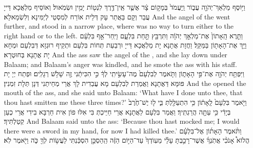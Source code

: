 {וַיּ֥וֹסֶף מַלְאַךְ־יְהֹוָ֖ה עֲב֑וֹר וַֽיַּעֲמֹד֙ בְּמָק֣וֹם צָ֔ר אֲשֶׁ֛ר אֵֽין־דֶּ֥רֶךְ לִנְט֖וֹת יָמִ֥ין וּשְׂמֹֽאול׃
}
{וְאוֹסֵיף מַלְאֲכָא דַּייָ עֲבַר וְקָם בַּאֲתַר עָק דְּלֵית אוֹרַח לְמִסְטֵי לְיַמִּינָא וְלִשְׂמָאלָא׃}
{And the angel of the \lord\space went further, and stood in a narrow place, where was no way to turn either to the right hand or to the left.}{}
{וַתֵּ֤רֶא הָֽאָתוֹן֙ אֶת־מַלְאַ֣ךְ יְהֹוָ֔ה וַתִּרְבַּ֖ץ תַּ֣חַת בִּלְעָ֑ם וַיִּֽחַר־אַ֣ף בִּלְעָ֔ם וַיַּ֥ךְ אֶת־הָאָת֖וֹן בַּמַּקֵּֽל׃}
{וַחֲזָת אֲתָנָא יָת מַלְאֲכָא דַּייָ וּרְבַעַת תְּחוֹת בִּלְעָם וּתְקֵיף רוּגְזָא דְּבִלְעָם וּמְחָא יָת אֲתָנָא בְּחוּטְרָא׃}
{And the ass saw the angel of the \lord, and she lay down under Balaam; and Balaam’s anger was kindled, and he smote the ass with his staff.}{}
{וַיִּפְתַּ֥ח יְהֹוָ֖ה אֶת־פִּ֣י הָאָת֑וֹן וַתֹּ֤אמֶר לְבִלְעָם֙ מֶה־עָשִׂ֣יתִֽי לְךָ֔ כִּ֣י הִכִּיתַ֔נִי זֶ֖ה שָׁלֹ֥שׁ רְגָלִֽים׃
}
{וּפְתַח יְיָ יָת פּוּמָּא דַּאֲתָנָא וַאֲמַרַת לְבִלְעָם מָא עֲבַדִית לָךְ אֲרֵי מְחֵיתַנִי דְּנָן תְּלָת זִמְנִין׃}
{And the \lord\space opened the mouth of the ass, and she said unto Balaam: ‘What have I done unto thee, that thou hast smitten me these three times?’}{}
{וַיֹּ֤אמֶר בִּלְעָם֙ לָֽאָת֔וֹן כִּ֥י הִתְעַלַּ֖לְתְּ בִּ֑י ל֤וּ יֶשׁ־חֶ֙רֶב֙ בְּיָדִ֔י כִּ֥י עַתָּ֖ה הֲרַגְתִּֽיךְ׃
}
{וַאֲמַר בִּלְעָם לַאֲתָנָא אֲרֵי חַיֵּיכְתְּ בִּי אִלּוּ פוֹן אִית חַרְבָּא בִידִי אֲרֵי כְעַן קְטַלְתִּיךְ׃}
{And Balaam said unto the ass: ‘Because thou hast mocked me; I would there were a sword in my hand, for now I had killed thee.’}{}
{וַתֹּ֨אמֶר הָאָת֜וֹן אֶל־בִּלְעָ֗ם הֲלוֹא֩ אָנֹכִ֨י אֲתֹֽנְךָ֜ אֲשֶׁר־רָכַ֣בְתָּ עָלַ֗י מֵעֽוֹדְךָ֙ עַד־הַיּ֣וֹם הַזֶּ֔ה הַֽהַסְכֵּ֣ן הִסְכַּ֔נְתִּי לַעֲשׂ֥וֹת לְךָ֖ כֹּ֑ה וַיֹּ֖אמֶר לֹֽא׃
}
